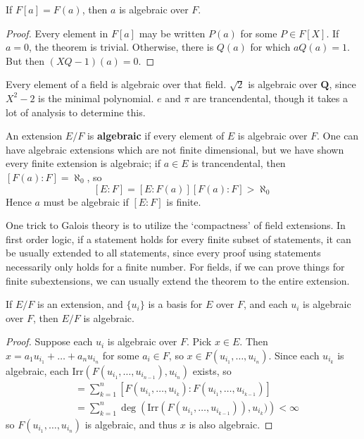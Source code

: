 \begin{lemma}
    If $F[a] = F(a)$, then $a$ is algebraic over $F$.
\end{lemma}
\begin{proof}
    Every element in $F[a]$ may be written $P(a)$ for some $P \in F[X]$. If $a = 0$, the theorem is trivial. Otherwise, there is $Q(a)$ for which $aQ(a) = 1$. But then $(XQ - 1)(a) = 0$.
\end{proof}

\begin{example}
    Every element of a field is algebraic over that field. $\sqrt{2}$ is algebraic over $\mathbf{Q}$, since $X^2 - 2$ is the minimal polynomial. $e$ and $\pi$ are trancendental, though it takes a lot of analysis to determine this.
\end{example}

An extension $E/F$ is {\bf algebraic} if every element of $E$ is algebraic over $F$. One can have algebraic extensions which are not finite dimensional, but we have shown every finite extension is algebraic; if $a \in E$ is trancendental, then $[F(a): F] = \aleph_0$, so
%
\[ [E:F] = [E:F(a)][F(a):F] > \aleph_0 \]
%
Hence $a$ must be algebraic if $[E:F]$ is finite.

One trick to Galois theory is to utilize the `compactness' of field extensions. In first order logic, if a statement holds for every finite subset of statements, it can be usually extended to all statements, since every proof using statements necessarily only holds for a finite number. For fields, if we can prove things for finite subextensions, we can usually extend the theorem to the entire extension.

\begin{theorem}
    If $E/F$ is an extension, and $\{ u_i \}$ is a basis for $E$ over $F$, and each $u_i$ is algebraic over $F$, then $E/F$ is algebraic.
\end{theorem}
\begin{proof}
    Suppose each $u_i$ is algebraic over $F$. Pick $x \in E$. Then $x = a_1 u_{i_1} + \dots + a_n u_{i_n}$ for some $a_i \in F$, so $x \in F(u_{i_1}, \dots, u_{i_n})$. Since each $u_{i_k}$ is algebraic, each $\text{Irr}(F(u_{i_1}, \dots, u_{i_{n-1}}), u_{i_n})$ exists, so
    \begin{align*}
        [F(u_{i_1}, \dots, u_{i_n}): F] &= \sum_{k = 1}^n \left[F(u_{i_1}, \dots, u_{i_k}): F(u_{i_1}, \dots, u_{i_{k-1}})\right]\\
        &= \sum_{k = 1}^n \deg\left(\text{Irr}\left(F(u_{i_1}, \dots, u_{i_{k-1}})\right), u_{i_k})\right) < \infty
    \end{align*}
    so $F(u_{i_1}, \dots, u_{i_n})$ is algebraic, and thus $x$ is also algebraic.
\end{proof}

